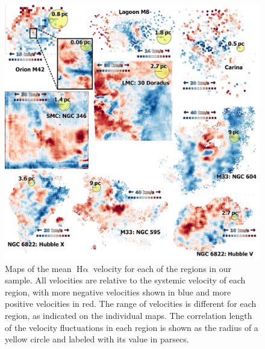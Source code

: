 \documentclass[fleqn,usenatbib, useAMS, a4paper]{mnras}
\newcommand\ha{\ensuremath{\text{H}\upalpha}}
\begin{document}
\begin{figure}
  \centering
  \includegraphics[width=\linewidth]{Figures/velocity-maps-mosaic}
  \caption{
    Maps of the mean \ha{} velocity for each of the regions in our sample.
    All velocities are relative to the systemic velocity of each region,
    with more negative velocities shown in blue and more positive velocities in red.
    The range of velocities is different for each region, as indicated on the individual maps.
    The correlation length of the velocity fluctuations in each region
    is shown as the radius of a yellow circle and labeled with its value in parsecs. 
  }
  \label{fig:velocity-maps}
\end{figure}
\end{document}

